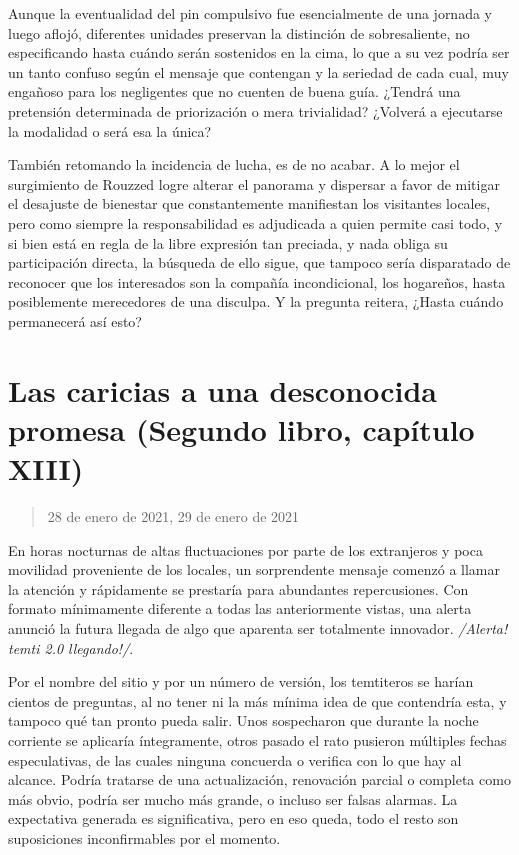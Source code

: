 \documentclass[
]{book}
\begin{document}
Aunque la eventualidad del pin compulsivo fue esencialmente de una jornada y luego aflojó, diferentes unidades preservan la distinción de sobresaliente, no especificando hasta cuándo serán sostenidos en la cima, lo que a su vez podría ser un tanto confuso según el mensaje que contengan y la seriedad de cada cual, muy engañoso para los negligentes que no cuenten de buena guía. ¿Tendrá una pretensión determinada de priorización o mera trivialidad? ¿Volverá a ejecutarse la modalidad o será esa la única?

También retomando la incidencia de lucha, es de no acabar. A lo mejor el surgimiento de Rouzzed logre alterar el panorama y dispersar a favor de mitigar el desajuste de bienestar que constantemente manifiestan los visitantes locales, pero como siempre la responsabilidad es adjudicada a quien permite casi todo, y si bien está en regla de la libre expresión tan preciada, y nada obliga su participación directa, la búsqueda de ello sigue, que tampoco sería disparatado de reconocer que los interesados son la compañía incondicional, los hogareños, hasta posiblemente merecedores de una disculpa. Y la pregunta reitera, ¿Hasta cuándo permanecerá así esto?

\hypertarget{las-caricias-a-una-desconocida-promesa-segundo-libro-capuxedtulo-xiii}{%
\section{Las caricias a una desconocida promesa (Segundo libro, capítulo XIII)}\label{las-caricias-a-una-desconocida-promesa-segundo-libro-capuxedtulo-xiii}}

\begin{quote}
28 de enero de 2021, 29 de enero de 2021
\end{quote}

En horas nocturnas de altas fluctuaciones por parte de los extranjeros y poca movilidad proveniente de los locales, un sorprendente mensaje comenzó a llamar la atención y rápidamente se prestaría para abundantes repercusiones. Con formato mínimamente diferente a todas las anteriormente vistas, una alerta anunció la futura llegada de algo que aparenta ser totalmente innovador. \emph{/Alerta! temti 2.0 llegando!/}.

Por el nombre del sitio y por un número de versión, los temtiteros se harían cientos de preguntas, al no tener ni la más mínima idea de que contendría esta, y tampoco qué tan pronto pueda salir. Unos sospecharon que durante la noche corriente se aplicaría íntegramente, otros pasado el rato pusieron múltiples fechas especulativas, de las cuales ninguna concuerda o verifica con lo que hay al alcance. Podría tratarse de una actualización, renovación parcial o completa como más obvio, podría ser mucho más grande, o incluso ser falsas alarmas. La expectativa generada es significativa, pero en eso queda, todo el resto son suposiciones inconfirmables por el momento.
\end{document}
